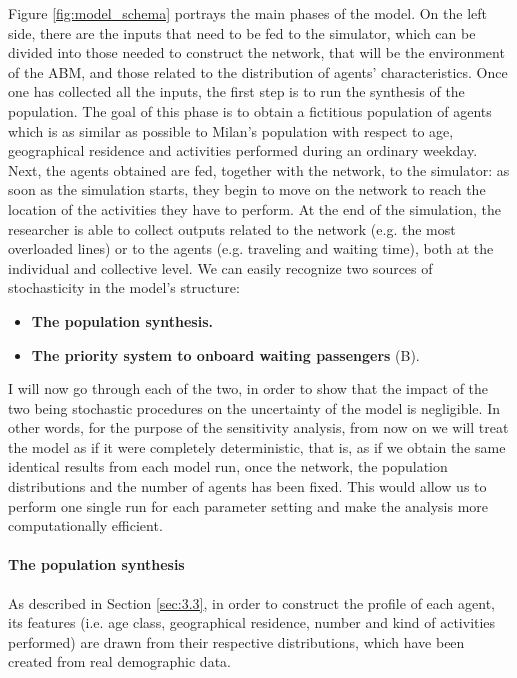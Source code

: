 Figure \ref{fig:model_schema} portrays the main phases of the model. On the left side, there are the inputs that need to be fed to the simulator, which can be divided into those needed to construct the network, that will be the environment of the ABM, and those related to the distribution of agents' characteristics. Once one has collected all the inputs, the first step is to run the synthesis of the population. The goal of this phase is to obtain a fictitious population of agents which is as similar as possible to Milan's population with respect to age, geographical residence and activities performed during an ordinary weekday. Next, the agents obtained are fed, together with the network, to the simulator: as soon as the simulation starts, they begin to move on the network to reach the location of the activities they have to perform. At the end of the simulation, the researcher is able to collect outputs related to the network (e.g. the most overloaded lines) or to the agents (e.g. traveling and waiting time), both at the individual and collective level. 
We can easily recognize two sources of stochasticity in the model's structure:
\begin{itemize}
	\item \textbf{The population synthesis.}
	\item \textbf{The priority system to onboard waiting passengers} (B). 
\end{itemize}
I will now go through each of the two, in order to show that the impact of the two being stochastic procedures on the uncertainty of the model is negligible. In other words, for the purpose of the sensitivity analysis, from now on we will treat the model as if it were completely deterministic, that is, as if we obtain the same identical results from each model run, once the network, the population distributions and the number of agents has been fixed. This would allow us to perform one single run for each parameter setting and make the analysis more computationally efficient.

\paragraph{The population synthesis} 
As described in Section \ref{sec:3.3}, in order to construct the profile of each agent, its features (i.e. age class, geographical residence, number and kind of activities performed) are drawn from their respective distributions, which have been created from real demographic data. 

